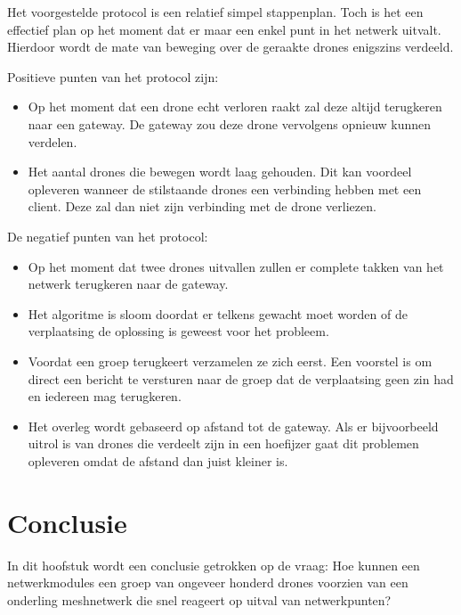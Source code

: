 \documentclass[a4paper, 11pt, oneside]{report}
\begin{document}
Het voorgestelde protocol is een relatief simpel stappenplan. 
Toch is het een effectief plan op het moment dat er maar een enkel punt in het netwerk uitvalt. 
Hierdoor wordt de mate van beweging over de geraakte drones enigszins verdeeld.

Positieve punten van het protocol zijn:
\begin{itemize}
	\item Op het moment dat een drone echt verloren raakt zal deze altijd terugkeren naar een gateway. De gateway zou deze drone vervolgens opnieuw kunnen verdelen.
	\item Het aantal drones die bewegen wordt laag gehouden. Dit kan voordeel opleveren wanneer de stilstaande drones een verbinding hebben met een client. Deze zal dan niet zijn verbinding met de drone verliezen.
\end{itemize}


De negatief punten van het protocol:
\begin{itemize}
	\item Op het moment dat twee drones uitvallen zullen er complete takken van het netwerk terugkeren naar de gateway.
	\item Het algoritme is sloom doordat er telkens gewacht moet worden of de verplaatsing de oplossing is geweest voor het probleem.
	\item Voordat een groep terugkeert verzamelen ze zich eerst. Een voorstel is om direct een bericht te versturen naar de groep dat de verplaatsing geen zin had en iedereen mag terugkeren.
	\item Het overleg wordt gebaseerd op afstand tot de gateway. Als er bijvoorbeeld uitrol is van drones die verdeelt zijn in een hoefijzer gaat dit problemen opleveren omdat de afstand dan juist kleiner is.
\end{itemize} 





\chapter{Conclusie}
\label{chapter:conclusie}
In dit hoofstuk wordt een conclusie getrokken op de vraag: Hoe kunnen een netwerkmodules een groep van ongeveer honderd drones voorzien van een onderling meshnetwerk die snel reageert op uitval van netwerkpunten?
\end{document}

